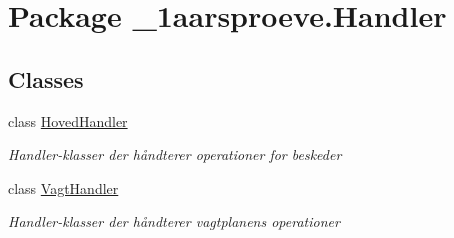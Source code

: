 \hypertarget{namespace__1aarsproeve_1_1_handler}{}\section{Package \+\_\+1aarsproeve.\+Handler}
\label{namespace__1aarsproeve_1_1_handler}
\subsection*{Classes}
\begin{DoxyCompactItemize}
\item 
class \hyperlink{class__1aarsproeve_1_1_handler_1_1_hoved_handler}{Hoved\+Handler}
\begin{DoxyCompactList}\small\item\em Handler-\/klasser der håndterer operationer for beskeder \end{DoxyCompactList}\item 
class \hyperlink{class__1aarsproeve_1_1_handler_1_1_vagt_handler}{Vagt\+Handler}
\begin{DoxyCompactList}\small\item\em Handler-\/klasser der håndterer vagtplanens operationer \end{DoxyCompactList}\end{DoxyCompactItemize}
